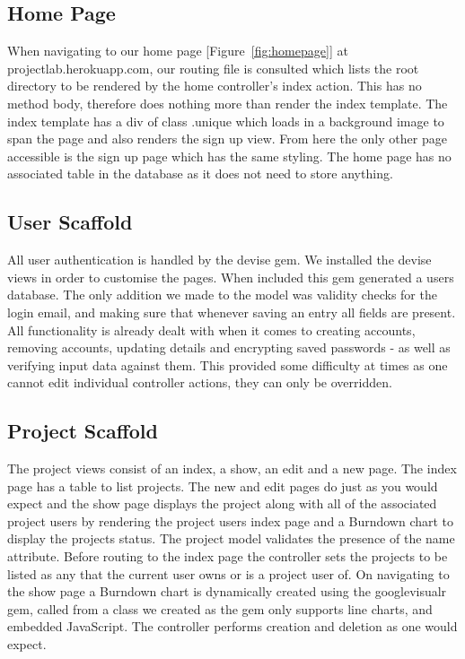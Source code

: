 \documentclass[a4wide, 11pt]{article}
\begin{document}
\subsection{Home Page}
When navigating to our home page [Figure~\ref{fig:homepage}] at projectlab.herokuapp.com, our routing file is consulted which lists the root directory to be rendered by the home controller’s index action. This has no method body, therefore does nothing more than render the index template. The index template has a div of class .unique which loads in a background image to span the page and also renders the sign up view. From here the only other page accessible is the sign up page which has the same styling. The home page has no associated table in the database as it does not need to store anything.

\subsection{User Scaffold}
All user authentication is handled by the devise gem. We installed the devise views in order to customise the pages. When included this gem generated a users database. The only addition we made to the model was validity checks for the login email, and making sure that whenever saving an entry all fields are present. All functionality is already dealt with when it comes to creating accounts, removing accounts, updating details and encrypting saved passwords - as well as verifying input data against them. This provided some difficulty at times as one cannot edit individual controller actions, they can only be overridden.

\subsection{Project Scaffold}
The project views consist of an index, a show, an edit and a new page. The index page has a table to list projects. The new and edit pages do just as you would expect and the show page displays the project along with all of the associated project users by rendering the project users index page and a Burndown chart to display the projects status. The project model validates the presence of the name attribute. Before routing to the index page the controller sets the projects to be listed as any that the current user owns or is a project user of. On navigating to the show page a Burndown chart is dynamically created using the googlevisualr gem, called from a class we created as the gem only supports line charts, and embedded JavaScript. The controller performs creation and deletion as one would expect.
\end{document}
